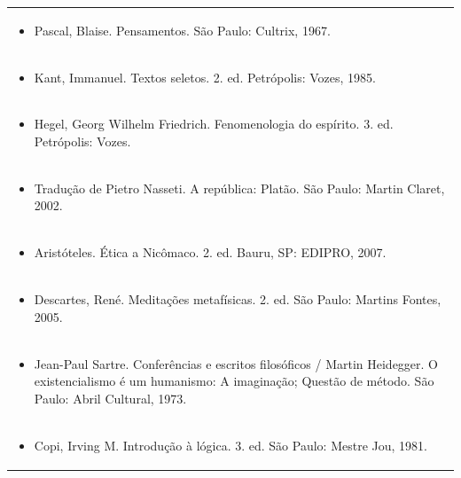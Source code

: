 \documentclass[11pt]{article}
\begin{document}
\begin{center}
\begin{longtable}{|p{4cm}|p{4cm}|p{4cm}|p{4cm}|}
\multicolumn{4}{|p{\dimexpr 16cm + 6\tabcolsep\relax}|}{\begin{itemize}\item Pascal, Blaise. Pensamentos. São Paulo: Cultrix, 1967.\end{itemize}}\\
\multicolumn{4}{|p{\dimexpr 16cm + 6\tabcolsep\relax}|}{\begin{itemize}\item Kant, Immanuel. Textos seletos. 2. ed. Petrópolis: Vozes, 1985.\end{itemize}}\\
\multicolumn{4}{|p{\dimexpr 16cm + 6\tabcolsep\relax}|}{\begin{itemize}\item Hegel, Georg Wilhelm Friedrich. Fenomenologia do espírito. 3. ed. Petrópolis: Vozes.\end{itemize}}\\
\multicolumn{4}{|p{\dimexpr 16cm + 6\tabcolsep\relax}|}{\begin{itemize}\item Tradução de Pietro Nasseti. A república: Platão. São Paulo: Martin Claret, 2002.\end{itemize}}\\
\multicolumn{4}{|p{\dimexpr 16cm + 6\tabcolsep\relax}|}{\begin{itemize}\item Aristóteles. Ética a Nicômaco. 2. ed. Bauru, SP: EDIPRO, 2007.\end{itemize}}\\
\multicolumn{4}{|p{\dimexpr 16cm + 6\tabcolsep\relax}|}{\begin{itemize}\item Descartes, René. Meditações metafísicas. 2. ed. São Paulo: Martins Fontes, 2005.\end{itemize}}\\
\multicolumn{4}{|p{\dimexpr 16cm + 6\tabcolsep\relax}|}{\begin{itemize}\item Jean-Paul Sartre. Conferências e escritos filosóficos / Martin Heidegger. O existencialismo é um humanismo: A imaginação; Questão de método. São Paulo: Abril Cultural, 1973.\end{itemize}}\\
\multicolumn{4}{|p{\dimexpr 16cm + 6\tabcolsep\relax}|}{\begin{itemize}\item Copi, Irving M. Introdução à lógica. 3. ed. São Paulo: Mestre Jou, 1981.\end{itemize}}\\

\end{longtable}
\end{center}
\end{document}
